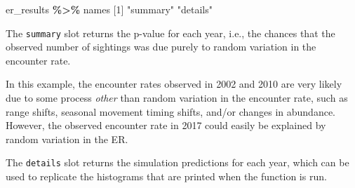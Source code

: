 \documentclass[
]{book}
\newenvironment{Shaded}{\begin{snugshade}}{\end{snugshade}}
\newcommand{\DecValTok}[1]{\textcolor[rgb]{0.00,0.00,0.81}{#1}}
\newcommand{\FloatTok}[1]{\textcolor[rgb]{0.00,0.00,0.81}{#1}}
\newcommand{\NormalTok}[1]{#1}
\newcommand{\SpecialCharTok}[1]{\textcolor[rgb]{0.81,0.36,0.00}{\textbf{#1}}}
\newcommand{\StringTok}[1]{\textcolor[rgb]{0.31,0.60,0.02}{#1}}
\begin{document}
\begin{Shaded}
\begin{Highlighting}[]
\NormalTok{er\_results }\SpecialCharTok{\%\textgreater{}\%}\NormalTok{ names}
\NormalTok{[}\DecValTok{1}\NormalTok{] }\StringTok{"summary"} \StringTok{"details"}
\end{Highlighting}
\end{Shaded}

The \texttt{summary} slot returns the p-value for each year, i.e., the chances that the observed number of sightings was due purely to random variation in the encounter rate.

\begin{Shaded}
\end{Shaded}

In this example, the encounter rates observed in 2002 and 2010 are very likely due to some process \emph{other} than random variation in the encounter rate, such as range shifts, seasonal movement timing shifts, and/or changes in abundance. However, the observed encounter rate in 2017 could easily be explained by random variation in the ER.

The \texttt{details} slot returns the simulation predictions for each year, which can be used to replicate the histograms that are printed when the function is run.
\end{document}
